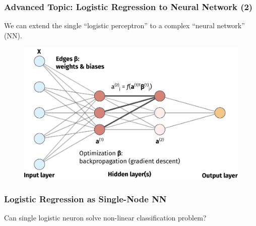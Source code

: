 \documentclass[10pt,aspectratio=169]{beamer}
\begin{document}
      \begin{frame}
        \frametitle{Advanced Topic: Logistic Regression to Neural
          Network (2)}
        We can extend the single ``logistic perceptron'' to a complex
        ``neural network'' (NN).

        \begin{figure}[t]
          \includegraphics[width=0.85\linewidth]{images/nn-2.pdf}
        \end{figure}
        
      \end{frame}

      \begin{frame}
        \frametitle{Logistic Regression as Single-Node NN}
        Can single logistic neuron solve non-linear classification
        problem?
        
      \end{frame}
\end{document}
